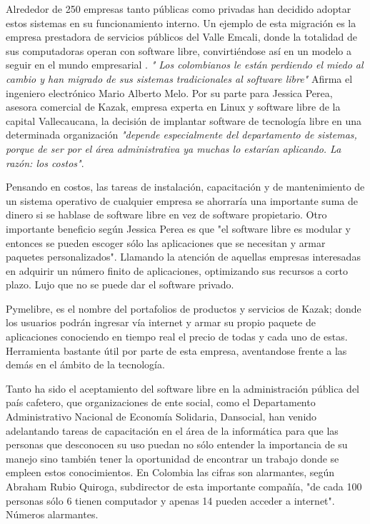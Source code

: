Alrededor de 250 empresas tanto públicas como privadas han decidido adoptar estos sistemas en su funcionamiento interno. Un ejemplo de esta migración es la empresa prestadora de 
servicios públicos del Valle Emcali, donde la totalidad de sus computadoras operan con software libre, convirtiéndose así en un modelo a seguir en el mundo empresarial
.
\textit{" Los colombianos le están perdiendo el miedo al cambio y han migrado de sus sistemas tradicionales al software libre"} Afirma el ingeniero electrónico Mario Alberto Melo. 
Por su parte para Jessica Perea, asesora comercial de Kazak, empresa experta en Linux y software libre de la capital Vallecaucana, la decisión de implantar software de tecnología 
libre en una determinada organización \textit{"depende especialmente del departamento de sistemas, porque de ser por el área administrativa ya muchas lo estarían aplicando. La 
razón: los costos"}. 

Pensando en costos, las tareas de instalación, capacitación y de mantenimiento de un sistema operativo de cualquier empresa se ahorraría una importante suma de dinero si se 
hablase de software libre en vez de software propietario. Otro importante beneficio según Jessica Perea es que "el software libre es modular y entonces se pueden escoger sólo las 
aplicaciones que se necesitan y armar paquetes personalizados". Llamando la atención de aquellas empresas interesadas en adquirir un número finito de aplicaciones, optimizando 
sus recursos a corto plazo. Lujo que no se puede dar el software privado.

Pymelibre, es el nombre del portafolios de productos y servicios de Kazak; donde los usuarios podrán ingresar vía internet y armar su propio paquete de aplicaciones conociendo en 
tiempo real el precio de todas y cada uno de estas. Herramienta bastante útil por parte de esta empresa, aventandose frente a las demás en el ámbito de la tecnología. 

Tanto ha sido el aceptamiento del software libre en la administración pública del país cafetero, que organizaciones de ente social, como el Departamento Administrativo Nacional 
de Economía Solidaria, Dansocial, han venido adelantando tareas de capacitación en el área de la informática para que las personas que desconocen su uso puedan no sólo entender 
la importancia de su manejo sino también tener la oportunidad de encontrar un trabajo donde se empleen estos conocimientos. En Colombia las cifras son alarmantes, según Abraham 
Rubio Quiroga, subdirector de esta importante compañía, "de cada 100 personas sólo 6 tienen computador y apenas 14 pueden acceder a internet". Números alarmantes.

